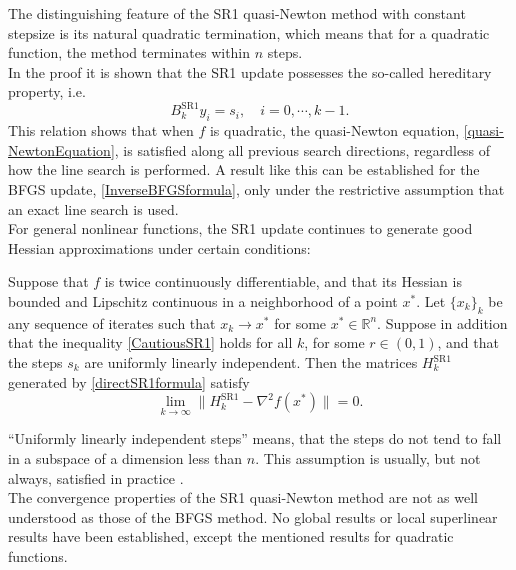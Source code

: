 The distinguishing feature of the SR1 quasi-Newton method with constant stepsize is its natural quadratic termination, which means that for a quadratic function, the method terminates within $n$ steps. \\
In the proof it is shown that the SR1 update possesses the so-called hereditary property, i.e. 
\begin{equation}\label{HereditaryProperty}
    B^{\mathrm{SR1}}_k y_i = s_i, \quad i = 0, \cdots, k-1.
\end{equation}
This relation shows that when $f$ is quadratic, the quasi-Newton equation, \cref{quasi-NewtonEquation}, is satisfied along all previous search directions, regardless of how the line search is performed. A result like this can be established for the BFGS update, \cref{InverseBFGSformula}, only under the restrictive assumption that an exact line search is used. \\
For general nonlinear functions, the SR1 update continues to generate good Hessian approximations under certain conditions:
\begin{theorem}
    Suppose that $f$ is twice continuously differentiable, and that its Hessian is bounded and Lipschitz continuous in a neighborhood of a point $x^{*}$. Let $\{x_k\}_k$ be any sequence of iterates such that $x_k \rightarrow x^{*}$ for some $x^{*} \in \mathbb{R}^n$. Suppose in addition that the inequality \cref{CautiousSR1} holds for all $k$, for some $r \in (0,1)$, and that the steps $s_k$ are uniformly linearly independent. Then the matrices $H^{\mathrm{SR1}}_k$ generated by \cref{directSR1formula} satisfy
    \begin{equation*}
        \lim_{k \to \infty} \lVert H^{\mathrm{SR1}}_k - \nabla^2 f(x^{*}) \rVert = 0.
    \end{equation*}
\end{theorem}
“Uniformly linearly independent steps” means, that the steps do not tend to fall in a subspace of a dimension less than $n$. This assumption is usually, but not always, satisfied in practice \cite[p.~144-149]{NocedalWright:2006}. \\
The convergence properties of the SR1 quasi-Newton method are not as well understood as those of the BFGS method. No global results or local superlinear results have been established, except the mentioned results for quadratic functions.